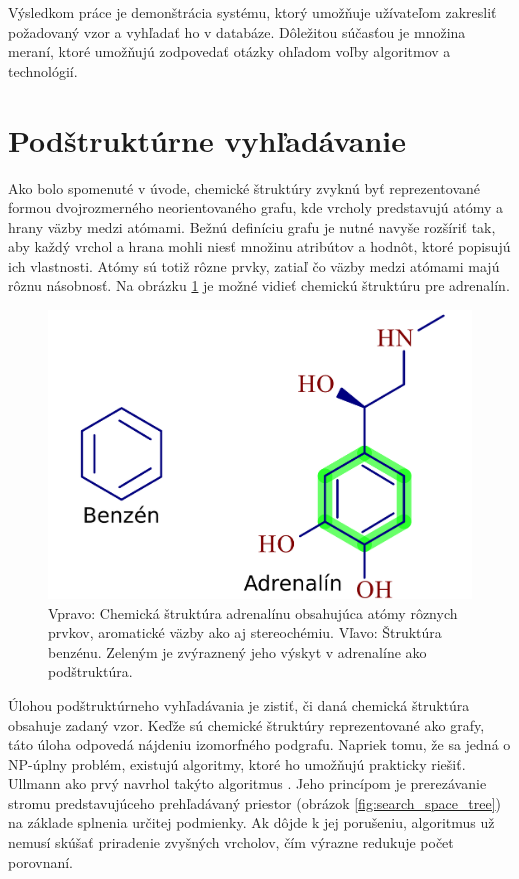 \documentclass[slovak]{ExcelAtFIT} %
\begin{document}
Výsledkom práce je demonštrácia systému, ktorý umožňuje užívateľom zakresliť požadovaný vzor a vyhľadať ho v databáze. Dôležitou súčasťou je množina meraní, ktoré umožňujú zodpovedať otázky ohľadom voľby algoritmov a technológií. 

\section{Podštruktúrne vyhľadávanie}
Ako bolo spomenuté v úvode, chemické štruktúry zvyknú byť reprezentované formou dvojrozmerného neorientovaného grafu, kde vrcholy predstavujú atómy a hrany väzby medzi atómami. Bežnú definíciu grafu je nutné navyše rozšíriť tak, aby každý vrchol a hrana mohli niesť množinu atribútov a hodnôt, ktoré popisujú ich vlastnosti. Atómy sú totiž rôzne prvky, zatiaľ čo väzby medzi atómami majú rôznu násobnosť. Na obrázku \ref{fig:adrenaline} je možné vidieť chemickú štruktúru pre adrenalín. 

\begin{figure}[!htb]
	\centering
	\includegraphics[height=9\baselineskip]{images/adrenaline.pdf}
	\caption{Vpravo: Chemická štruktúra adrenalínu obsahujúca atómy rôznych prvkov, aromatické väzby ako aj stereochémiu. Vľavo: Štruktúra benzénu. Zeleným je zvýraznený jeho výskyt v adrenalíne ako podštruktúra.}
	\label{fig:adrenaline}
\end{figure}

Úlohou podštruktúrneho vyhľadávania je zistiť, či daná chemická štruktúra obsahuje zadaný vzor. Keďže sú chemické štruktúry reprezentované ako grafy, táto úloha odpovedá nájdeniu izomorfného podgrafu. Napriek tomu, že sa jedná o NP-úplny problém, existujú algoritmy, ktoré ho umožňujú prakticky riešiť. Ullmann ako prvý navrhol takýto algoritmus \cite{ullmann}. Jeho princípom je prerezávanie stromu predstavujúceho pre\-hľa\-dá\-va\-ný priestor (obrázok \ref{fig:search_space_tree}) na základe splnenia určitej podmienky. Ak dôjde k jej porušeniu, algoritmus už nemusí skúšať priradenie zvyšných vrcholov, čím výrazne redukuje počet porovnaní. 
\end{document}
